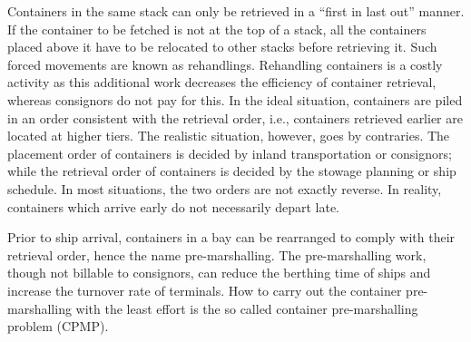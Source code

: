 \documentclass[review,3p,times,authoryear,12pt]{elsarticle}
\begin{document}
Containers in the same stack can only be retrieved in a ``first in last out'' manner. If the container to be fetched is not at the top of a stack, all the containers placed above it have to be relocated to other stacks before retrieving it. Such forced movements are known as rehandlings. Rehandling containers is a costly activity as this additional work decreases the efficiency of container retrieval, whereas consignors do not pay for this. In the ideal situation, containers are piled in an order consistent with the retrieval order, i.e., containers retrieved earlier are located at higher tiers. The realistic situation, however, goes by contraries. The placement order of containers is decided by inland transportation or consignors; while the retrieval order of containers is decided by the stowage planning or ship schedule. In most situations, the two orders are not exactly reverse. In reality, containers which arrive early do not necessarily depart late.

Prior to ship arrival, containers in a bay can be rearranged to comply with their retrieval order, hence the name pre-marshalling. The pre-marshalling work, though not billable to consignors, can reduce the berthing time of ships and increase the turnover rate of terminals. How to carry out the container pre-marshalling with the least effort is the so called container pre-marshalling problem (CPMP).

\end{document}
